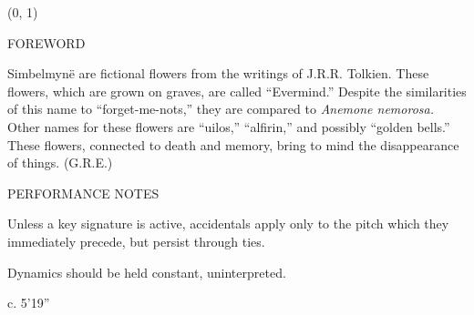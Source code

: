 \documentclass[11pt]{article}
\newcommand*\circled[1]{\tikz[baseline=(char.base)]{
            \node[shape=circle,draw,inner sep=1pt] (char) {#1};}}
\begin{document}
\begin{textblock}{23}(0, 1)
\begin{center}
\huge FOREWORD
\end{center}
\end{textblock}

\vspace*{0.25\baselineskip}

\begingroup
\begin{center}
Simbelmyn\"e are fictional flowers from the writings of J.R.R. Tolkien. These flowers, which are grown on graves, are called ``Evermind.'' Despite the similarities of this name to ``forget-me-nots,'' they are compared to \textit{Anemone nemorosa.} Other names for these flowers are ``uilos,'' ``alfirin,'' and possibly ``golden bells.'' These flowers, connected to death and memory, bring to mind the disappearance of things.
\rightskip\leftskip
\phantom{text} \hfill (G.R.E.)
\end{center}
\endgroup

\vspace*{0.25\baselineskip}

\begin{center}
\huge PERFORMANCE NOTES
\end{center}

\begingroup
\begin{center}
\pmb{\circled{1}} Unless a key signature is active, accidentals apply only to the pitch which they immediately precede, but persist through ties.
\rightskip\leftskip
\phantom{text} \hfill \phantom{()}
\end{center}

\begin{center}
\pmb{\circled{2}} Dynamics should be held constant, uninterpreted.
\rightskip\leftskip
\phantom{text} \hfill \phantom{()}
\end{center}
\endgroup

\vspace*{15\baselineskip}

\begin{center}
c. 5'19''
\end{center}
\end{document}
